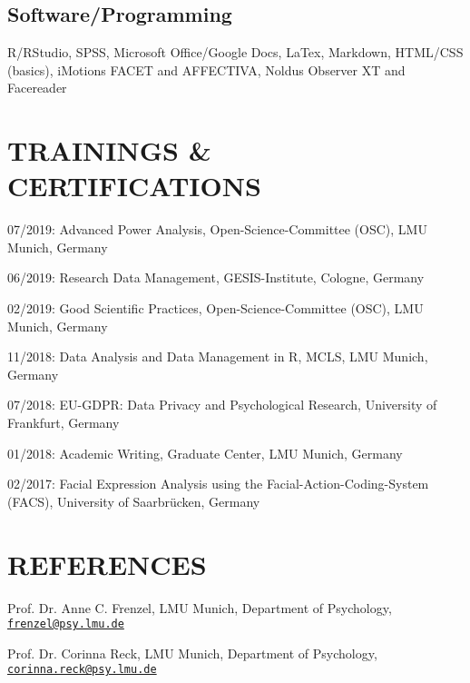 \documentclass[letterpaper]{article}
\renewenvironment{itemize}{ %
  \begin{list}{}{ %
    \setlength{\leftmargin}{2.5em} %
  }
}{
  \end{list}
}
\begin{document}
\subsection*{Software/Programming}
\begin{itemize}
\item R/RStudio, SPSS, Microsoft Office/Google Docs, LaTex, Markdown, HTML/CSS (basics), iMotions FACET and AFFECTIVA, Noldus Observer XT and Facereader
\end{itemize}


\section*{TRAININGS \& CERTIFICATIONS}
\begin{itemize}
\item 07/2019: Advanced Power Analysis, Open-Science-Committee (OSC), LMU Munich, Germany
\item 06/2019: Research Data Management, GESIS-Institute, Cologne, Germany
\item 02/2019: Good Scientific Practices, Open-Science-Committee (OSC), LMU Munich, Germany
\item 11/2018: Data Analysis and Data Management in R, MCLS, LMU Munich, Germany
\item 07/2018: EU-GDPR: Data Privacy and Psychological Research, University of Frankfurt, Germany
\item 01/2018: Academic Writing, Graduate Center, LMU Munich, Germany
\item 02/2017: Facial Expression Analysis using the Facial-Action-Coding-System (FACS), University of Saarbrücken, Germany
\end{itemize}


\section*{REFERENCES}
\begin{itemize}
\item[$\ast$] Prof. Dr. Anne C. Frenzel, LMU Munich, Department of Psychology, \href{mailto:frenzel@psy.lmu.de}{\tt frenzel@psy.lmu.de} 
\item[$\ast$] Prof. Dr. Corinna Reck, LMU Munich, Department of Psychology, \href{mailto:corinna.reck@psy.lmu.de}{\tt corinna.reck@psy.lmu.de} 
\end{itemize}
\end{document}
